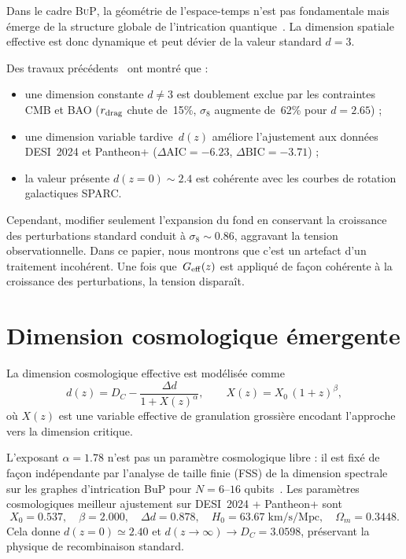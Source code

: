\documentclass[11pt]{article}
\newcommand{\DC}{D_C}
\newcommand{\Geff}{G_{\rm eff}}
\newcommand{\sig}{\sigma_8}
\newcommand{\BuP}{\textsc{BuP}}
\begin{document}
Dans le cadre \BuP, la géométrie de l'espace-temps n'est pas
fondamentale mais émerge de la structure globale de l'intrication
quantique~\cite{hamdad2026bup}. La dimension spatiale effective est
donc dynamique et peut dévier de la valeur standard $d = 3$.

Des travaux précédents~\cite{hamdad2026bup} ont montré que :
\begin{itemize}
  \item une dimension constante $d \neq 3$ est doublement exclue par
        les contraintes CMB et BAO ($r_{\rm drag}$ chute de~15\%,
        $\sig$ augmente de~62\% pour $d = 2.65$) ;
  \item une dimension variable tardive~$d(z)$ améliore l'ajustement
        aux données DESI~2024 et Pantheon+
        ($\Delta\mathrm{AIC} = -6.23$, $\Delta\mathrm{BIC} = -3.71$) ;
  \item la valeur présente $d(z=0) \sim 2.4$ est cohérente avec les
        courbes de rotation galactiques SPARC.
\end{itemize}

Cependant, modifier seulement l'expansion du fond en conservant la
croissance des perturbations standard conduit à $\sig \sim 0.86$,
aggravant la tension observationnelle.
Dans ce papier, nous montrons que c'est un artefact d'un traitement
incohérent. Une fois que~$\Geff(z)$ est appliqué de façon cohérente
à la croissance des perturbations, la tension disparaît.

\section{Dimension cosmologique émergente}

La dimension cosmologique effective est modélisée
comme~\cite{hamdad2026bup}
\begin{equation}
  d(z) = \DC - \frac{\Delta d}{1 + X(z)^\alpha},
  \qquad
  X(z) = X_0\,(1+z)^\beta,
  \label{eq:dz}
\end{equation}
où $X(z)$ est une variable effective de granulation grossière encodant
l'approche vers la dimension critique.

L'exposant $\alpha = 1.78$ n'est pas un paramètre cosmologique libre :
il est fixé de façon indépendante par l'analyse de taille finie (FSS)
de la dimension spectrale sur les graphes d'intrication BuP pour
$N = 6$--$16$ qubits~\cite{hamdad2026bup}.
Les paramètres cosmologiques meilleur ajustement sur DESI~2024 + Pantheon+ sont
\begin{equation}
  X_0 = 0.537, \quad \beta = 2.000, \quad \Delta d = 0.878,
  \quad H_0 = 63.67\;\mathrm{km/s/Mpc}, \quad \Omega_m = 0.3448.
\end{equation}
Cela donne $d(z=0) \simeq 2.40$ et
$d(z\to\infty) \to \DC = 3.0598$,
préservant la physique de recombinaison standard.
\end{document}
